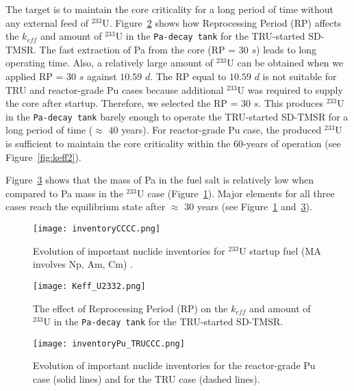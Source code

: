 The target is to maintain the core criticality for a long period of time without any external feed of $^{233}$U. Figure~\ref{fig:Keff_U2332} shows how Reprocessing Period (RP) affects the $k_{eff}$ and amount of $^{233}$U in the \texttt{Pa-decay tank} for the TRU-started SD-TMSR. The fast extraction of Pa from the core (RP = $30$ $s$) leads to long operating time. Also, a relatively large amount of $^{233}$U can be obtained when we applied RP = $30$ $s$ against $10.59$ $d$. The RP equal to $10.59$ $d$ is not suitable for TRU and reactor-grade Pu cases because additional $^{233}$U was required to supply the core after startup. Therefore, we selected the RP = $30$ $s$. This produces $^{233}$U in the \texttt{Pa-decay tank} barely enough to operate the TRU-started SD-TMSR for a long period of time ($\approx$ $40$ years). For reactor-grade Pu case, the produced $^{233}$U is sufficient to maintain the core criticality within the 60-years of operation (see Figure~\ref{fig:keff2}).

Figure~\ref{fig:inventoryPu_TRUCCC} shows that the mass of Pa in the fuel salt 
is relatively low when compared to Pa mass in the $^{233}$U case (Figure~\ref{fig:inventoryCCCC}). Major 
elements for all three cases reach the equilibrium state after $\approx$ $30$ 
years (see Figure~\ref{fig:inventoryCCCC} and~\ref{fig:inventoryPu_TRUCCC}).

\begin{figure}
	\centering
	\texttt{[image: inventoryCCCC.png]}
	\vspace{-0.4in}
	\caption{Evolution of important nuclide inventories for $^{233}$U 
		startup fuel (MA involves Np, Am, Cm) \cite{ashraf2019whole_core}.}
	\label{fig:inventoryCCCC}
\end{figure}

\begin{figure}
	\centering
	\texttt{[image: Keff\_U2332.png]}
	\vspace{-0.5in}
	\caption{The effect of Reprocessing Period (RP) on the $k_{eff}$ and amount of $^{233}$U in the \texttt{Pa-decay tank} for the TRU-started SD-TMSR.}
	\label{fig:Keff_U2332}
\end{figure}

\begin{figure}
	\centering
	\texttt{[image: inventoryPu\_TRUCCC.png]}
	\vspace{-0.5in}
	\caption{Evolution of important nuclide inventories for the 
		reactor-grade Pu case (solid lines) and for the TRU case (dashed lines).}
	\label{fig:inventoryPu_TRUCCC}
\end{figure}

